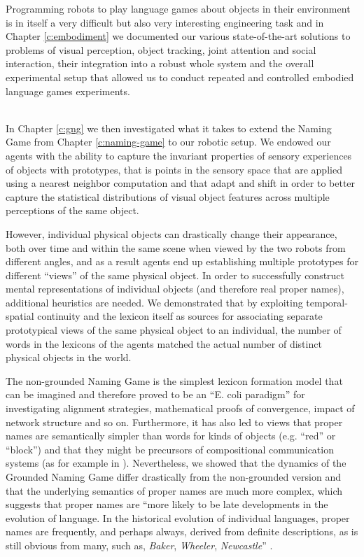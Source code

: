 Programming robots to play language games about objects in their
environment is in itself a very difficult but also very interesting
engineering task and in Chapter \ref{c:embodiment} we documented our
various state-of-the-art solutions to problems of visual perception,
object tracking, joint attention and social interaction, their
integration into a robust whole system and the overall experimental
setup that allowed us to conduct repeated and controlled embodied
language games experiments.

~\\

 In
Chapter \ref{c:gng} we then investigated what it takes to extend the
Naming Game from Chapter \ref{c:naming-game} to our robotic setup. We
endowed our agents with the ability to capture the invariant
properties of sensory experiences of objects with prototypes, that is
points in the sensory space that are applied using a nearest neighbor
computation and that adapt and shift in order to better capture the
statistical distributions of visual object features across multiple
perceptions of the same object.

However, individual physical objects can drastically change their
appearance, both over time and within the same scene when viewed by
the two robots from different angles, and as a result agents end up
establishing multiple prototypes for different ``views'' of the same
physical object. In order to successfully construct mental
representations of individual objects (and therefore real proper
names), additional heuristics are needed. We demonstrated that by
exploiting temporal-spatial continuity and the lexicon itself as
sources for associating separate prototypical views of the same
physical object to an individual, the number of words in the lexicons
of the agents matched the actual number of distinct physical objects
in the world.


The non-grounded Naming Game is the simplest lexicon formation model
that can be imagined and therefore proved to be an ``E. coli
paradigm'' for investigating alignment strategies, mathematical proofs
of convergence, impact of network structure and so on. Furthermore, it
has also led to views that proper names are semantically simpler than
words for kinds of objects (e.g. ``red'' or ``block'') and that they
might be precursors of compositional communication systems (as for
example in \citealp{steels05emergence}). Nevertheless, we showed that
the dynamics of the Grounded Naming Game differ drastically from the
non-grounded version and that the underlying semantics of proper names
are much more complex, which suggests that proper names are ``more
likely to be late developments in the evolution of language. In the
historical evolution of individual languages, proper names are
frequently, and perhaps always, derived from definite descriptions, as
is still obvious from many, such as, \emph{Baker}, \emph{Wheeler},
\emph{Newcastle}'' \citep[p. 266]{hurford03neural}.



